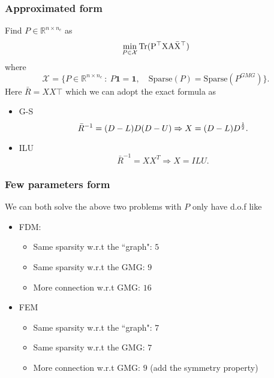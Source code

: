 \subsubsection{Approximated form}
	Find $P \in \mathbb{R}^{n\times n_c}$ as 
\begin{equation}\label{min-tra}
\min_{P \in \mathcal{X}} \rm{Tr} (P^\top X A \bar X^\top)
\end{equation}
where 
\begin{equation}\label{min-con}
\mathcal{X}_{} = \{P \in \mathbb{R}^{n\times n_c} ~:~ P \bm{1} =  \bm{1}, \quad \text{Sparse}(P) = \text{Sparse}(P^{GMG}) \}.
\end{equation}
Here $\bar R = XX\top$ which we can adopt the exact formula as 
\begin{itemize}
	\item G-S
	\begin{equation}\label{XXT:G-S}
	\bar R^{-1} = (D-L)D(D-U) \Rightarrow X = (D-L)D^{1 \over 2}.
	\end{equation}
	\item ILU
		\begin{equation}\label{XXT:ILU}
		\bar R^{-1} = XX^T \Rightarrow X = ILU.
	\end{equation}
\end{itemize}

\subsubsection{Few parameters form}
We can both solve the above two problems with $P$ only have d.o.f like 
\begin{itemize}
	\item FDM:
\begin{itemize}
	\item Same sparsity w.r.t the ``graph": $5$
	\item Same sparsity w.r.t the GMG: $9$
	\item More connection w.r.t GMG: $16$
\end{itemize}
	\item FEM
\begin{itemize}
		\item Same sparsity w.r.t the ``graph": $7$
		\item Same sparsity w.r.t the GMG: $7$
		\item More connection w.r.t GMG: $9$ (add the symmetry property)
	\end{itemize}
\end{itemize}



